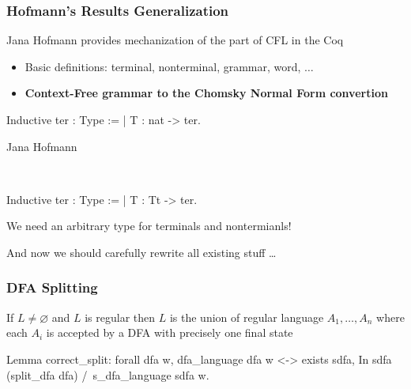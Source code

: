 \documentclass[xcolor=table]{beamer}
\begin{document}
\begin{frame}[fragile] \frametitle{Hofmann's Results Generalization}

Jana Hofmann provides mechanization of the part of CFL in the Coq
\begin{itemize}
    \item Basic definitions: terminal, nonterminal, grammar, word, $\dots$
    \pause
    \item \textbf{Context-Free grammar to the Chomsky Normal Form convertion}
\end{itemize}
\pause

\begin{center}
  \begin{minipage}[t]{0.47\textwidth}
\begin{center}
    \begin{pyglist}[language=coq, numbers=none, numbersep=5pt]
    Inductive ter : Type :=
     | T : nat -> ter.
  	\end{pyglist}

    Jana Hofmann
  \end{center}
  \end{minipage}
  \pause
  ~ \vline \vline ~
  \begin{minipage}[t]{0.47\textwidth}
\begin{center}
    \begin{pyglist}[language=coq, numbers=none, numbersep=5pt]
    Inductive ter : Type :=
     | T : Tt -> ter.
    \end{pyglist}

    We need an arbitrary type for terminals and nontermianls!
  \end{center}
  \end{minipage}

\pause
\vspace{0.5cm}
And now we should carefully rewrite all existing stuff \dots
\end{center}


\end{frame}


\begin{frame}[fragile] \frametitle{DFA Splitting}
If $ L \neq \varnothing $ and $L$ is regular then $L$ is the union of regular language $A_1, \ldots , A_n$ where each $A_i$ is accepted by a DFA with precisely one final state
\pause
\begin{pyglist}[language=coq, numbers=none, numbersep=5pt]
Lemma correct_split:
   forall dfa w,
     dfa_language dfa w <->
     exists sdfa,
        In sdfa (split_dfa dfa) /\ s_dfa_language sdfa w.
\end{pyglist}
\end{frame}
\end{document}
